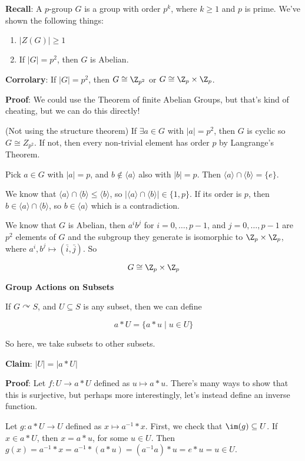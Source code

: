 \documentclass[12pt]{article}
\newcommand{\lr}[1]{\langle #1 \rangle}
\def\acts{\curvearrowright}
\begin{document}
{\bf Recall}: A $p$-group $G$ is a group with order $p^k$, where $k \ge 1$ and
$p$ is prime. We've shown the following things:

\begin{enumerate}
  \item $|Z(G)| \ge 1$
  \item If $|G| = p^2$, then $G$ is Abelian.
\end{enumerate}

{\bf Corrolary}: If $|G| = p^2$, then $G \cong \Z_{p^2}$ or $G \cong \Z_p \times
\Z_p$.

{\bf Proof}: We could use the Theorem of finite Abelian Groups, but that's kind
of cheating, but we can do this directly!

(Not using the structure theorem) If $\exists a \in G$ with $|a| = p^2$, then
$G$ is cyclic so $G \cong Z_{p^2}$. If not, then every non-trivial element has
order $p$ by Langrange's Theorem.

Pick $a \in G$ with $|a| = p$, and $b \not\in \lr{a}$ also with $|b| = p$. Then
$\lr {a} \cap \lr{b} = \{e\}$.

We know that $\lr{a} \cap \lr{b} \le \lr{b}$, so $|\lr{a} \cap \lr{b}| \in \{1,
p\}$. If its order is $p$, then $b \in \lr{a} \cap \lr{b}$, so $b \in \lr{a}$
which is a contradiction.

We know that $G$ is Abelian, then $a^i b^j$ for $i = 0, \dots, p - 1$, and $j =
0, \dots, p - 1$ are $p^2$ elements of $G$ and the subgroup they generate is
isomorphic to $\Z_p \times \Z_p$, where $a^i, b^j \mapsto (\bar i, \bar j)$. So

\[
  G \cong \Z_p \times \Z_p
\]

{\bf Group Actions on Subsets}

If $G \acts S$, and $U \subseteq S$ is any subset, then we can define

\[
  a * U = \{a * u \mid u \in U \}
\]

So here, we take subsets to other subsets.

{\bf Claim}: $|U| = |a * U|$

{\bf Proof}: Let $f: U \to a * U$ defined as $u \mapsto a * u$. There's many
ways to show that this is surjective, but perhaps more interestingly, let's
instead define an inverse function.

Let $g: a * U \to U$ defined as $x \mapsto a^{-1} * x$. First, we check that
$\im(g) \subseteq U$. If $x \in a * U$, then $x = a * u$, for some $u \in U$.
Then $g(x) = a^{-1} * x = a^{-1} * (a * u) = (a^{-1}a) * u = e * u = u \in U$.
\end{document}
